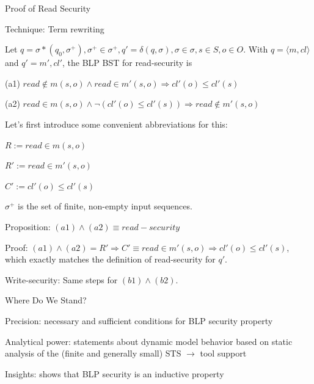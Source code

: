 \documentclass[a4paper]{article}
\begin{document}
\begin{multicols}{3}
    Proof of Read Security
    \begin{itemize*}
        \item Technique: Term rewriting
        \item Let $q=\sigma*(q_0 ,\sigma^+),\sigma^+\in\sigma^+,q'=\delta(q,\sigma),\sigma\in\sigma,s\in S,o\in O$. With $q=⟨m,cl⟩$ and $q'=m',cl'$, the BLP BST for read-security is
        \begin{itemize*}
            \item (a1) $read \not\in m(s,o) \wedge read\in m'(s,o) \Rightarrow cl'(o) \leq cl'(s)$
            \item (a2) $read \in m(s,o) \wedge\lnot (cl'(o)\leq cl'(s)) \Rightarrow read \not\in m'(s,o)$
            \item Let’s first introduce some convenient abbreviations for this:
            \begin{itemize*}
                \item $R:=read\in m(s,o)$
                \item $R':=read\in m'(s,o)$
                \item $C':=cl'(o) \leq cl'(s)$
                \item $\sigma^+$ is the set of finite, non-empty input sequences.
            \end{itemize*}
            \item Proposition: $(a1) \wedge (a2)\equiv read-security$
            \item Proof: $(a1) \wedge (a2)= R' \Rightarrow C'\equiv read\in m'(s,o) \Rightarrow cl'(o)\leq cl'(s)$, which exactly matches the definition of read-security for $q'$.
            \item Write-security: Same steps for $(b1)\wedge (b2)$.
        \end{itemize*}
    \end{itemize*}

    Where Do We Stand?
    \begin{itemize*}
        \item Precision: necessary and sufficient conditions for BLP security property
        \item Analytical power: statements about dynamic model behavior based on static analysis of the (finite and generally small) STS $\rightarrow$ tool support
        \item Insights: shows that BLP security is an inductive property
    \end{itemize*}


\end{multicols}
\end{document}
